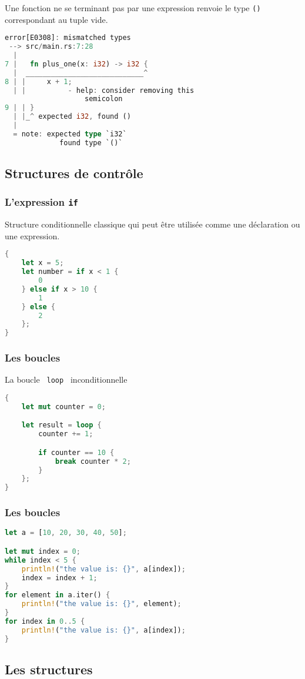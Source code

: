 \begin{frame}[fragile]
  Une fonction ne se terminant pas par une expression renvoie le type \texttt{()} correspondant au tuple vide.
  \begin{lstlisting}[language=rust]
error[E0308]: mismatched types
 --> src/main.rs:7:28
  |
7 |   fn plus_one(x: i32) -> i32 {
  |  ____________________________^
8 | |     x + 1;
  | |          - help: consider removing this
                   semicolon
9 | | }
  | |_^ expected i32, found ()
  |
  = note: expected type `i32`
             found type `()`
  \end{lstlisting}
\end{frame}

\subsection{Structures de contrôle}
\begin{frame}[fragile]
  \frametitle{L'expression \texttt{if}}
Structure conditionnelle classique qui peut être utilisée comme une déclaration ou une expression.
\begin{lstlisting}[language=rust]
{
    let x = 5;
    let number = if x < 1 {
        0
    } else if x > 10 {
        1
    } else {
        2
    };
}
\end{lstlisting}  
\end{frame}
\begin{frame}[fragile]
  \frametitle{Les boucles}
La boucle \texttt{ loop } inconditionnelle
  \begin{lstlisting}[language=rust]
{
    let mut counter = 0;

    let result = loop {
        counter += 1;

        if counter == 10 {
            break counter * 2;
        }
    };
}
  \end{lstlisting}
\end{frame}
\begin{frame}[fragile]
  \frametitle{Les boucles}
  \begin{lstlisting}[language=rust, basicstyle=\small{}]
let a = [10, 20, 30, 40, 50];

let mut index = 0;
while index < 5 {
    println!("the value is: {}", a[index]);
    index = index + 1;
}
for element in a.iter() {
    println!("the value is: {}", element);
}
for index in 0..5 {
    println!("the value is: {}", a[index]);
}
  \end{lstlisting}
\end{frame}
\subsection{Les structures}

